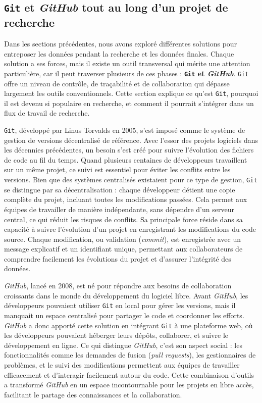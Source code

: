 \documentclass[
  letterpaper,
  DIV=11,
  numbers=noendperiod,
  oneside]{scrreprt}
\begin{document}
\hypertarget{git-et-github-tout-au-long-dun-projet-de-recherche}{%
\subsection{\texorpdfstring{\texttt{Git} et \emph{GitHub} tout au long
d'un projet de
recherche}{Git et GitHub tout au long d'un projet de recherche}}\label{git-et-github-tout-au-long-dun-projet-de-recherche}}

Dans les sections précédentes, nous avons exploré différentes solutions
pour entreposer les données pendant la recherche et les données finales.
Chaque solution a ses forces, mais il existe un outil transversal qui
mérite une attention particulière, car il peut traverser plusieurs de
ces phases : \textbf{\texttt{Git} et \emph{GitHub}}. \texttt{Git} offre
un niveau de contrôle, de traçabilité et de collaboration qui dépasse
largement les outils conventionnels. Cette section explique ce qu'est
\texttt{Git}, pourquoi il est devenu si populaire en recherche, et
comment il pourrait s'intégrer dans un flux de travail de recherche.

\texttt{Git}, développé par Linus Torvalds en 2005, s'est imposé comme
le système de gestion de versions décentralisé de référence. Avec
l'essor des projets logiciels dans les décennies précédentes, un besoin
s'est créé pour suivre l'évolution des fichiers de code au fil du temps.
Quand plusieurs centaines de développeurs travaillent sur un même
projet, ce suivi est essentiel pour éviter les conflits entre les
versions. Bien que des systèmes centralisés existaient pour ce type de
gestion, \texttt{Git} se distingue par sa décentralisation : chaque
développeur détient une copie complète du projet, incluant toutes les
modifications passées. Cela permet aux équipes de travailler de manière
indépendante, sans dépendre d'un serveur central, ce qui réduit les
risques de conflits. Sa principale force réside dans sa capacité à
suivre l'évolution d'un projet en enregistrant les modifications du code
source. Chaque modification, ou validation (\emph{commit}), est
enregistrée avec un message explicatif et un identifiant unique,
permettant aux collaborateurs de comprendre facilement les évolutions du
projet et d'assurer l'intégrité des données.

\emph{GitHub}, lancé en 2008, est né pour répondre aux besoins de
collaboration croissants dans le monde du développement du logiciel
libre. Avant \emph{GitHub}, les développeurs pouvaient utiliser
\texttt{Git} en local pour gérer les versions, mais il manquait un
espace centralisé pour partager le code et coordonner les efforts.
\emph{GitHub} a donc apporté cette solution en intégrant \texttt{Git} à
une plateforme web, où les développeurs pouvaient héberger leurs dépôts,
collaborer, et suivre le développement en ligne. Ce qui distingue
\emph{GitHub}, c'est son aspect social : les fonctionnalités comme les
demandes de fusion (\emph{pull requests}), les gestionnaires de
problèmes, et le suivi des modifications permettent aux équipes de
travailler efficacement et d'interagir facilement autour du code. Cette
combinaison d'outils a transformé \emph{GitHub} en un espace
incontournable pour les projets en libre accès, facilitant le partage
des connaissances et la collaboration.
\end{document}
